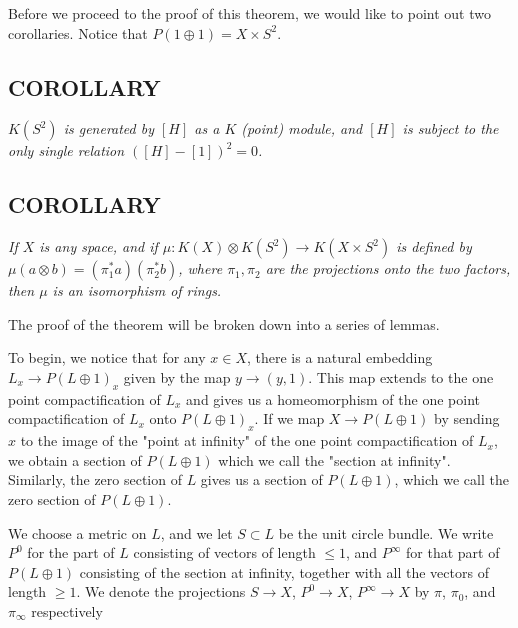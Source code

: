 Before we proceed to the proof of this theorem, we would like to point out two corollaries. Notice that $P(1 \oplus 1) = X \times S^2$. \par 

\subsection{COROLLARY}\label{cor:2.2.2} \textit{$K(S^2)$ is generated by $[H]$ as a $K$ (point) module, and $[H]$ is subject to the only single relation $([H]-[1])^2 = 0$.} \par 

\subsection{COROLLARY}\label{cor:2.2.3} \textit{If $X$ is any space, and if $\mu: K(X) \otimes K(S^2) \to K(X \times S^2)$ is defined by $\mu(a \otimes b) = (\pi^*_1 a)(\pi^*_2 b)$, where $\pi_1, \pi_2$ are the projections onto the two factors, then $\mu$ is an isomorphism of rings.} \par \hfill

The proof of the theorem will be broken down into a series of lemmas. \par

To begin, we notice that for any $x \in X$, there is a natural embedding $L_x \to P(L \oplus 1)_x$ given by the map $y \to (y, 1)$. This map extends to the one point compactification of $L_x$ and gives us a homeomorphism of the one point compactification of $L_x$ onto $P(L \oplus 1)_x$. If we map $X \to P(L \oplus 1)$ by sending $x$ to the image of the "point at infinity" of the one point compactification of $L_x$, we obtain a section of $P(L \oplus 1)$ which we call the "section at infinity". Similarly, the zero section of $L$ gives us a section of $P(L \oplus 1)$, which we call the zero section of $P(L \oplus 1)$. \par 

We choose a metric on $L$, and we let $S \subset L$ be the unit circle bundle. We write $P^0$ for the part of $L$ consisting  of vectors of length $\leq 1$, and $P^\infty$ for that part of $P(L \oplus 1)$ consisting of the section at infinity, together with all the vectors of length $\geq 1$. We denote the projections $S \to X$, $P^0 \to X$, $P^\infty \to X$ by $\pi$, $\pi_0$, and $\pi_\infty$ respectively \par 

